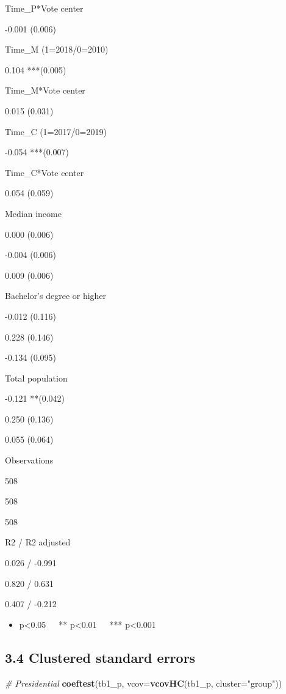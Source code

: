 \documentclass[
]{article}
\newenvironment{Shaded}{\begin{snugshade}}{\end{snugshade}}
\newcommand{\CommentTok}[1]{\textcolor[rgb]{0.56,0.35,0.01}{\textit{#1}}}
\newcommand{\DataTypeTok}[1]{\textcolor[rgb]{0.13,0.29,0.53}{#1}}
\newcommand{\KeywordTok}[1]{\textcolor[rgb]{0.13,0.29,0.53}{\textbf{#1}}}
\newcommand{\NormalTok}[1]{#1}
\newcommand{\StringTok}[1]{\textcolor[rgb]{0.31,0.60,0.02}{#1}}
\providecommand{\tightlist}{%
  \setlength{\itemsep}{0pt}\setlength{\parskip}{0pt}}
\begin{document}
Time\_P*Vote center

-0.001 (0.006)

Time\_M (1=2018/0=2010)

0.104 ***(0.005)

Time\_M*Vote center

0.015 (0.031)

Time\_C (1=2017/0=2019)

-0.054 ***(0.007)

Time\_C*Vote center

0.054 (0.059)

Median income

0.000 (0.006)

-0.004 (0.006)

0.009 (0.006)

Bachelor's degree or higher

-0.012 (0.116)

0.228 (0.146)

-0.134 (0.095)

Total population

-0.121 **(0.042)

0.250 (0.136)

0.055 (0.064)

Observations

508

508

508

R2 / R2 adjusted

0.026 / -0.991

0.820 / 0.631

0.407 / -0.212

\begin{itemize}
\tightlist
\item
  p\textless0.05~~~** p\textless0.01~~~*** p\textless0.001
\end{itemize}

\hypertarget{clustered-standard-errors}{%
\subsection{3.4 Clustered standard
errors}\label{clustered-standard-errors}}

\begin{Shaded}
\begin{Highlighting}[]
\CommentTok{# Presidential }
\KeywordTok{coeftest}\NormalTok{(tb1_p, }\DataTypeTok{vcov=}\KeywordTok{vcovHC}\NormalTok{(tb1_p, }\DataTypeTok{cluster=}\StringTok{"group"}\NormalTok{)) }
\end{Highlighting}
\end{Shaded}
\end{document}
